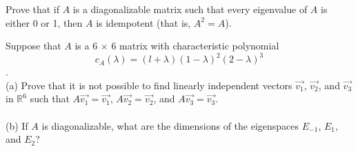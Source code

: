 \documentclass[12pt,letterpaper]{hmcpset}
\begin{document}
\begin{solution}
    \vfill
\end{solution}

\newpage

\begin{problem}[4.4 \#49]
    Prove that if $A$ is a diagonalizable matrix such that every eigenvalue of $A$ is either 0 or 1, then $A$ is idempotent (that is, $A^2=A$).
\end{problem}

\begin{solution}
    \vfill
\end{solution}

\newpage

\begin{problem}[4.4 \#51]
    Suppose that $A$ is a 6 $\times$ 6 matrix with characteristic polynomial
    \[c_A(\lambda)=(l+\lambda)(1-\lambda)^2(2-\lambda)^3\].
    \\
    (a) Prove that it is not possible to find linearly independent vectors $\vec{v_1}$, $\vec{v_2}$, and $\vec{v_3}$ in $\mathbb{R}^6$ such that $A\vec{v_1}=\vec{v_1}$, $A\vec{v_2}=\vec{v_2}$, and $A\vec{v_3}=\vec{v_3}$.
    \\\\
    (b) If $A$ is diagonalizable, what are the dimensions of the eigenspaces $E_{-1}$, $E_1$, and $E_2$?
\end{problem}

\begin{solution}
    \vfill
\end{solution}

\newpage
\end{document}
